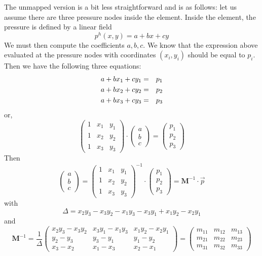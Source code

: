 The unmapped version is a bit less straightforward and is as follows:
let us assume there are three pressure nodes inside the element.
Inside the element, the pressure is defined by a linear field
\[
p^h(x,y) = a+bx+cy
\]
We must then compute the coefficients $a,b,c$. We know that 
the expression above evaluated at the pressure nodes with coordinates $(x_i,y_i)$ should 
be equal to $p_i$. Then we have the following three equations:
\begin{eqnarray}
a + bx_1 + cy_1 &=& p_1 \nonumber\\
a + bx_2 + cy_2 &=& p_2 \nonumber\\
a + bx_3 + cy_3 &=& p_3 \nonumber
\end{eqnarray}
or, 
\[
\left(
\begin{array}{ccc}
1 & x_1 & y_1 \\
1 & x_2 & y_2 \\
1 & x_3 & y_3 
\end{array}
\right)
\cdot 
\left(
\begin{array}{ccc}
a \\ b \\ c
\end{array}
\right)
=
\left(
\begin{array}{ccc}
p_1 \\ p_2 \\ p_3
\end{array}
\right)
\]
Then 
\[
\left(
\begin{array}{ccc}
a \\ b \\ c
\end{array}
\right)
=
\left(
\begin{array}{ccc}
1 & x_1 & y_1 \\
1 & x_2 & y_2 \\
1 & x_3 & y_3 
\end{array}
\right)^{-1}
\cdot
\left(
\begin{array}{ccc}
p_1 \\ p_2 \\ p_3
\end{array}
\right)
= {\bm M}^{-1} \cdot \vec{p}
\]
with 
\[
\Delta = x_2y_3-x_3y_2 - x_1y_3-x_3y_1 + x_1y_2-x_2y_1
\]
and 
\[
{\bm M}^{-1} = \frac{1}{\Delta}
\left(
\begin{array}{ccc}
x_2y_3-x_3y_2 & x_3y_1-x_1y_3 & x_1y_2-x_2y_1 \\
y_2-y_3 & y_3-y_1 & y_1-y_2 \\
x_3-x_2 & x_1-x_3 & x_2-x_1
\end{array}
\right)
=
\left(
\begin{array}{ccc}
m_{11} & m_{12} & m_{13} \\
m_{21} & m_{22} & m_{23} \\
m_{31} & m_{32} & m_{33} 
\end{array}
\right)
\]
